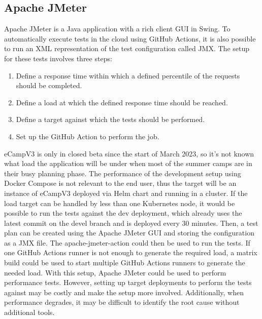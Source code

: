 \documentclass[conference]{IEEEtran}
\begin{document}
\subsection{Apache JMeter}
Apache JMeter is a Java application with a rich client GUI in Swing\cite{website-apache-jmeter}.
To automatically execute tests in the cloud using GitHub Actions, it is also possible to run an XML representation
of the test configuration called JMX. The setup for these tests involves three steps:
\begin{enumerate}
	\item Define a response time within which a defined percentile of the requests should be completed.
	\item Define a load at which the defined response time should be reached.
	\item Define a target against which the tests should be performed.
	\item Set up the GitHub Action to perform the job.
\end{enumerate}
eCampV3 is only in closed beta since the start of March 2023, so it's not known what load the application will be
under when most of the summer camps are in their busy planning phase.
The performance of the development setup using Docker Compose is not relevant to the end user, thus the target will
be an instance of eCampV3 deployed via Helm chart and running in a cluster.
If the load target can be handled by less than one Kubernetes node, it would be possible to run the tests against
the dev deployment, which already uses the latest commit on the devel branch and is deployed every 30 minutes.
Then, a test plan can be created using the Apache JMeter GUI and storing the configuration as a JMX file.
The apache-jmeter-action\cite{apache-jmeter-github-action} could then be used to run the tests.
If one GitHub Actions runner is not enough to generate the required load, a matrix build could be used to
start multiple GitHub Actions runners to generate the needed load.
\newline
With this setup, Apache JMeter could be used to perform performance tests.
However, setting up target deployments to perform the tests against may be costly and make the setup more involved.
Additionally, when performance degrades, it may be difficult to identify the root cause without additional tools.
\end{document}

